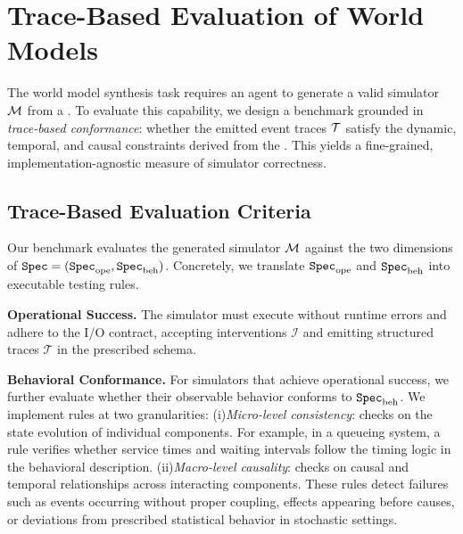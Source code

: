 \section{Trace-Based Evaluation of World Models} \label{sec:method_evaluation}


The world model synthesis task requires an agent to generate a valid simulator $\mathcal{M}$ from a \spec. To evaluate this capability, we design a benchmark grounded in \emph{trace-based conformance}: whether the emitted event traces $\mathcal{T}$ satisfy the dynamic, temporal, and causal constraints derived from the \spec. This yields a fine-grained, implementation-agnostic measure of simulator correctness.


\subsection{Trace-Based Evaluation Criteria}
\label{sec:eval_framework}

Our benchmark evaluates the generated simulator $\mathcal{M}$ against the two dimensions of ${\texttt{Spec}} = ({\texttt{Spec}}_{\mathrm{ope}},{\texttt{Spec}}_{\mathrm{beh}})$. Concretely, we translate ${\texttt{Spec}}_{\mathrm{ope}}$ and ${\texttt{Spec}}_{\mathrm{beh}}$ into executable testing rules.

\noindent\textbf{Operational Success.}
The simulator must execute without runtime errors and adhere to the I/O contract, accepting interventions $\mathcal{I}$ and emitting structured traces $\mathcal{T}$ in the prescribed schema.

\noindent\textbf{Behavioral Conformance.}
For simulators that achieve operational success, we further evaluate whether their observable behavior conforms to ${\texttt{Spec}}_{\mathrm{beh}}$. We implement rules at two granularities:
(i)\emph{Micro-level consistency}: checks on the state evolution of individual components. For example, in a queueing system, a rule verifies whether service times and waiting intervals follow the timing logic in the behavioral description.
(ii)\emph{Macro-level causality}: checks on causal and temporal relationships across interacting components. These rules detect failures such as events occurring without proper coupling, effects appearing before causes, or deviations from prescribed statistical behavior in stochastic settings.


